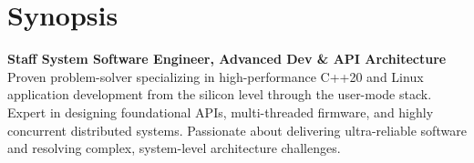 \section{Synopsis}
\textbf{Staff System Software Engineer, Advanced Dev \& API Architecture} \\
Proven problem-solver specializing in high-performance C++20 and Linux application development from the silicon level through the user-mode stack. Expert in designing foundational APIs, multi-threaded firmware, and highly concurrent distributed systems. Passionate about delivering ultra-reliable software and resolving complex, system-level architecture challenges.
